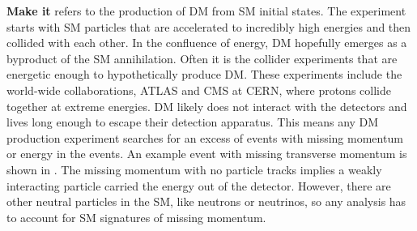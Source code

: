 \textbf{Make it} refers to the production of DM from SM initial states.
The experiment starts with SM particles that are accelerated to incredibly high energies and then collided with each other.
In the confluence of energy, DM hopefully emerges as a byproduct of the SM annihilation.
Often it is the collider experiments that are energetic enough to hypothetically produce DM.
These experiments include the world-wide collaborations, ATLAS and CMS at CERN, where protons collide together at extreme energies.
DM likely does not interact with the detectors and lives long enough to escape their detection apparatus.
This means any DM production experiment searches for an excess of events with missing momentum or energy in the events.
An example event with missing transverse momentum is shown in .
The missing momentum with no particle tracks implies a weakly interacting particle carried the energy out of the detector.
However, there are other neutral particles in the SM, like neutrons or neutrinos, so any analysis has to account for SM signatures of missing momentum. \cite{atlas:met_dm_precise}

\begin{figure}[h]
\end{figure}

